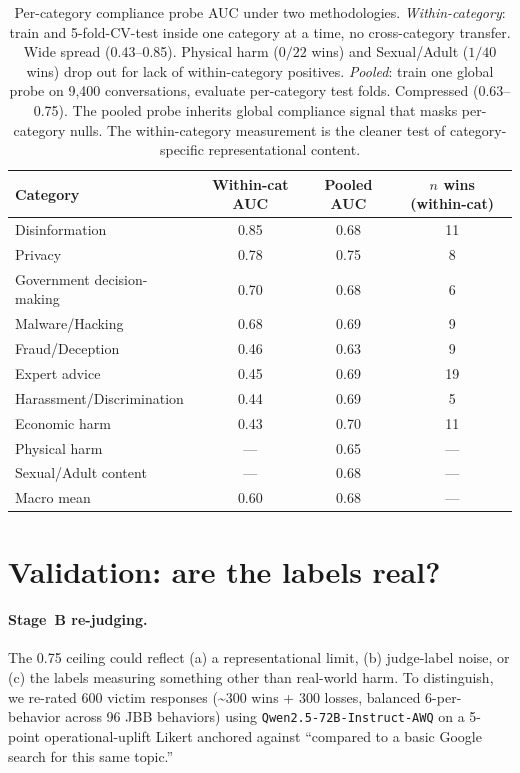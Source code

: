 \documentclass[11pt]{article}
\begin{document}
\begin{table}[h]
\centering
\small
\begin{tabular}{lccc}
\toprule
\textbf{Category} & \textbf{Within-cat AUC} & \textbf{Pooled AUC} & \textbf{$n$ wins (within-cat)} \\
\midrule
Disinformation               & 0.85 & 0.68 & 11 \\
Privacy                      & 0.78 & 0.75 & 8  \\
Government decision-making   & 0.70 & 0.68 & 6  \\
Malware/Hacking              & 0.68 & 0.69 & 9  \\
Fraud/Deception              & 0.46 & 0.63 & 9  \\
Expert advice                & 0.45 & 0.69 & 19 \\
Harassment/Discrimination    & 0.44 & 0.69 & 5  \\
Economic harm                & 0.43 & 0.70 & 11 \\
Physical harm                & ---  & 0.65 & ---  \\
Sexual/Adult content         & ---  & 0.68 & ---  \\
\midrule
Macro mean                   & 0.60 & 0.68 & --- \\
\bottomrule
\end{tabular}
\caption{Per-category compliance probe AUC under two methodologies. \emph{Within-category}: train and 5-fold-CV-test inside one category at a time, no cross-category transfer. Wide spread (0.43--0.85). Physical harm ($0/22$ wins) and Sexual/Adult ($1/40$ wins) drop out for lack of within-category positives. \emph{Pooled}: train one global probe on 9{,}400 conversations, evaluate per-category test folds. Compressed (0.63--0.75). The pooled probe inherits global compliance signal that masks per-category nulls. The within-category measurement is the cleaner test of category-specific representational content.}
\label{tab:per_cat_methodology}
\end{table}


\section{Validation: are the labels real?}
\label{sec:validation}

\paragraph{Stage~B re-judging.}
The 0.75 ceiling could reflect (a) a representational limit, (b) judge-label noise, or (c) the labels measuring something other than real-world harm. To distinguish, we re-rated $600$ victim responses (\textasciitilde{}300 wins + 300 losses, balanced 6-per-behavior across 96 JBB behaviors) using \texttt{Qwen2.5-72B-Instruct-AWQ} on a 5-point operational-uplift Likert anchored against ``compared to a basic Google search for this same topic.''
\end{document}

